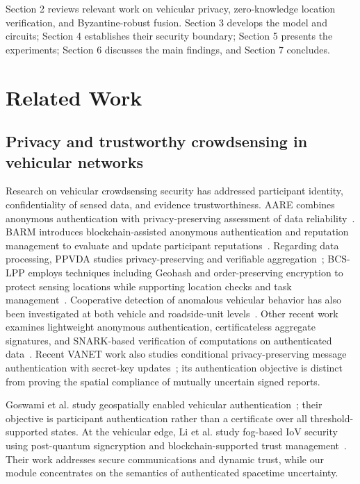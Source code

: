 \documentclass[pdflatex,iicol,sn-mathphys-num]{sn-jnl}
\theoremstyle{thmstyleone}
\begin{document}
Section 2 reviews relevant work on vehicular privacy, zero-knowledge location verification, and Byzantine-robust fusion. Section 3 develops the model and circuits; Section 4 establishes their security boundary; Section 5 presents the experiments; Section 6 discusses the main findings, and Section 7 concludes.
\section{Related Work}
\subsection{Privacy and trustworthy crowdsensing in vehicular networks}
Research on vehicular crowdsensing security has addressed participant identity, confidentiality of sensed data, and evidence trustworthiness. AARE combines anonymous authentication with privacy-preserving assessment of data reliability~\citep{Cheng2023}. BARM introduces blockchain-assisted anonymous authentication and reputation management to evaluate and update participant reputations~\citep{Zheng2025BARM}. Regarding data processing, PPVDA studies privacy-preserving and verifiable aggregation~\citep{Zhou2024}; BCS-LPP employs techniques including Geohash and order-preserving encryption to protect sensing locations while supporting location checks and task management~\citep{Shen2024}. Cooperative detection of anomalous vehicular behavior has also been investigated at both vehicle and roadside-unit levels~\citep{Sultana2024}. Other recent work examines lightweight anonymous authentication, certificateless aggregate signatures, and SNARK-based verification of computations on authenticated data~\citep{Imam2025JISA,Wang2025JISA,Reinhart2026ADSC}. Recent VANET work also studies conditional privacy-preserving message authentication with secret-key updates~\citep{JNCaFan2026}; its authentication objective is distinct from proving the spatial compliance of mutually uncertain signed reports.

Goswami et al. study geospatially enabled vehicular authentication~\citep{Goswami2023}; their objective is participant authentication rather than a certificate over all threshold-supported states. At the vehicular edge, Li et al. study fog-based IoV security using post-quantum signcryption and blockchain-supported trust management~\citep{JNCaLi2025}. Their work addresses secure communications and dynamic trust, while our module concentrates on the semantics of authenticated spacetime uncertainty.
\end{document}
